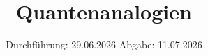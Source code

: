 


\subject{v23}
\title{Quantenanalogien}
\date{%
  Durchführung: 29.06.2026
  \hspace{3em}
  Abgabe: 11.07.2026
}



\maketitle
\thispagestyle{empty}
\tableofcontents
\newpage








\printbibliography{}




